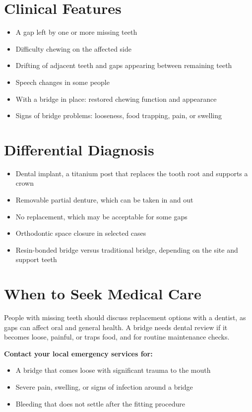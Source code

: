 \section*{Clinical Features}
\begin{itemize}
    \item A gap left by one or more missing teeth
    \item Difficulty chewing on the affected side
    \item Drifting of adjacent teeth and gaps appearing between remaining teeth
    \item Speech changes in some people
    \item With a bridge in place: restored chewing function and appearance
    \item Signs of bridge problems: looseness, food trapping, pain, or swelling
\end{itemize}

\section*{Differential Diagnosis}
\begin{itemize}
    \item Dental implant, a titanium post that replaces the tooth root and supports a crown
    \item Removable partial denture, which can be taken in and out
    \item No replacement, which may be acceptable for some gaps
    \item Orthodontic space closure in selected cases
    \item Resin-bonded bridge versus traditional bridge, depending on the site and support teeth
\end{itemize}

\section*{When to Seek Medical Care}
People with missing teeth should discuss replacement options with a dentist, as gaps can affect oral and general health. A bridge needs dental review if it becomes loose, painful, or traps food, and for routine maintenance checks.

\textbf{Contact your local emergency services for:}
\begin{itemize}
    \item A bridge that comes loose with significant trauma to the mouth
    \item Severe pain, swelling, or signs of infection around a bridge
    \item Bleeding that does not settle after the fitting procedure
\end{itemize}

